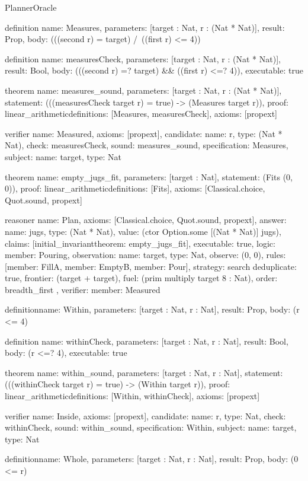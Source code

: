\begin{lexlean}{PlannerOracle}
\begin{semanticmodule}
definition{
  name: Measures,
  parameters: [target : Nat, r : (Nat * Nat)],
  result: Prop,
  body: (((second r) = target) /\ ((first r) <= 4))
}

definition{
  name: measuresCheck,
  parameters: [target : Nat, r : (Nat * Nat)],
  result: Bool,
  body: (((second r) =? target) && ((first r) <=? 4)),
  executable: true
}

theorem{
  name: measures_sound,
  parameters: [target : Nat, r : (Nat * Nat)],
  statement: (((measuresCheck target r) = true) -> (Measures target r)),
  proof: linear_arithmetic{definitions: [Measures, measuresCheck]},
  axioms: [propext]
}

verifier{
  name: Measured,
  axioms: [propext],
  candidate: {name: r, type: (Nat * Nat)},
  check: measuresCheck,
  sound: measures_sound,
  specification: Measures,
  subject: {name: target, type: Nat}
}

theorem{
  name: empty_jugs_fit,
  parameters: [target : Nat],
  statement: (Fits (0, 0)),
  proof: linear_arithmetic{definitions: [Fits]},
  axioms: [Classical.choice, Quot.sound, propext]
}

reasoner{
  name: Plan,
  axioms: [Classical.choice, Quot.sound, propext],
  answer: {name: jugs, type: (Nat * Nat), value: (ctor Option.some [(Nat * Nat)] jugs)},
  claims: [initial_invariant{theorem: empty_jugs_fit}],
  executable: true,
  logic: {member: Pouring},
  observation: {name: target, type: Nat},
  observe: (0, 0),
  rules: [{member: FillA}, {member: EmptyB}, {member: Pour}],
  strategy: search{
    deduplicate: true,
    frontier: (target + target),
    fuel: (prim multiply target 8 : Nat),
    order: breadth_first
  },
  verifier: {member: Measured}
}

definition{name: Within, parameters: [target : Nat, r : Nat], result: Prop, body: (r <= 4)}

definition{
  name: withinCheck,
  parameters: [target : Nat, r : Nat],
  result: Bool,
  body: (r <=? 4),
  executable: true
}

theorem{
  name: within_sound,
  parameters: [target : Nat, r : Nat],
  statement: (((withinCheck target r) = true) -> (Within target r)),
  proof: linear_arithmetic{definitions: [Within, withinCheck]},
  axioms: [propext]
}

verifier{
  name: Inside,
  axioms: [propext],
  candidate: {name: r, type: Nat},
  check: withinCheck,
  sound: within_sound,
  specification: Within,
  subject: {name: target, type: Nat}
}

definition{name: Whole, parameters: [target : Nat, r : Nat], result: Prop, body: (0 <= r)}


\end{semanticmodule}
\end{lexlean}
